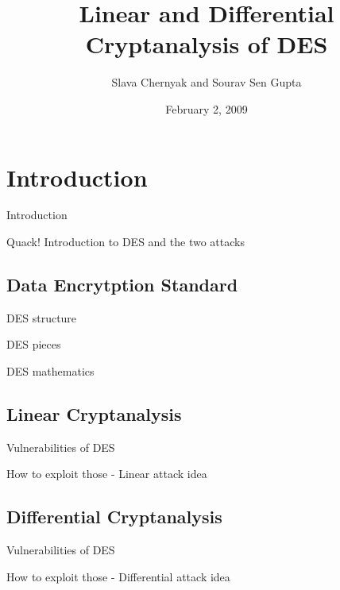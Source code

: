 \documentclass[9pt]{beamer}
\title{Linear and Differential Cryptanalysis of DES}
\author{Slava Chernyak and Sourav Sen Gupta}
\institute{University of Washington}
\date{February 2, 2009}
\begin{document}
\begin{frame}
\titlepage
\end{frame}

\section{Introduction}
\begin{frame}{Introduction}
\begin{block}{Quack!}
Introduction to DES and the two attacks
\end{block}
\end{frame}

\subsection{Data Encrytption Standard}
\begin{frame}
DES structure

\end{frame}

\begin{frame}
DES pieces

\end{frame}

\begin{frame}
DES mathematics

\end{frame}

\subsection{Linear Cryptanalysis}
\begin{frame}
Vulnerabilities of DES

\end{frame}

\begin{frame}
How to exploit those - Linear attack idea

\end{frame}


\subsection{Differential Cryptanalysis}
\begin{frame}
Vulnerabilities of DES

\end{frame}

\begin{frame}
How to exploit those - Differential attack idea

\end{frame}
\end{document}
